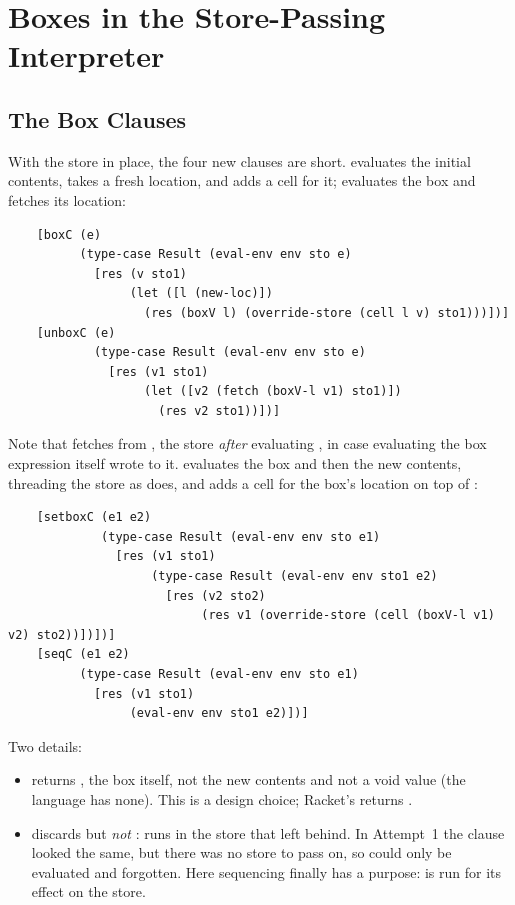 \section{Boxes in the Store-Passing Interpreter}
\label{sec:storeboxes}

\subsection{The Box Clauses}

With the store in place, the four new clauses are short.  evaluates the initial contents, takes a fresh location, and adds a cell for it;  evaluates the box and fetches its location:
\begin{lstlisting}
    [boxC (e)
          (type-case Result (eval-env env sto e)
            [res (v sto1)
                 (let ([l (new-loc)])
                   (res (boxV l) (override-store (cell l v) sto1)))])]
    [unboxC (e)
            (type-case Result (eval-env env sto e)
              [res (v1 sto1)
                   (let ([v2 (fetch (boxV-l v1) sto1)])
                     (res v2 sto1))])]
\end{lstlisting}
Note that  fetches from , the store \emph{after} evaluating , in case evaluating the box expression itself wrote to it.  evaluates the box and then the new contents, threading the store as  does, and adds a cell for the box's location on top of :
\begin{lstlisting}
    [setboxC (e1 e2)
             (type-case Result (eval-env env sto e1)
               [res (v1 sto1)
                    (type-case Result (eval-env env sto1 e2)
                      [res (v2 sto2)
                           (res v1 (override-store (cell (boxV-l v1) v2) sto2))])])]
    [seqC (e1 e2)
          (type-case Result (eval-env env sto e1)
            [res (v1 sto1)
                 (eval-env env sto1 e2)])]
\end{lstlisting}
Two details:
\begin{itemize}
  \item {} returns , the box itself, not the new contents and not a void value (the language has none). This is a design choice; Racket's  returns .
  \item {} discards  but \emph{not} :  runs in the store that  left behind. In Attempt~1 the  clause looked the same, but there was no store to pass on, so  could only be evaluated and forgotten. Here sequencing finally has a purpose:  is run for its effect on the store.
\end{itemize}

